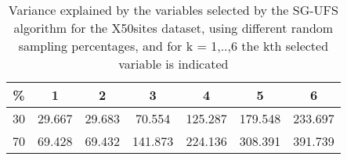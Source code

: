 \begin{table}
	\begin{center}
		\begin{tabular}{c c c c c c c}
			\% & 1 & 2 & 3 & 4 & 5 & 6 \\
			\hline
			30 & 29.667 & 29.683 & 70.554 & 125.287 & 179.548 & 233.697 \\
			70 & 69.428 & 69.432 & 141.873 & 224.136 & 308.391 & 391.739 \\
		\end{tabular}
	\end{center}
	\caption{Variance explained by the variables selected by the SG-UFS algorithm for the X50sites dataset, using different random sampling percentages, and for k = 1,..,6 the kth selected variable is indicated}
\end{table}